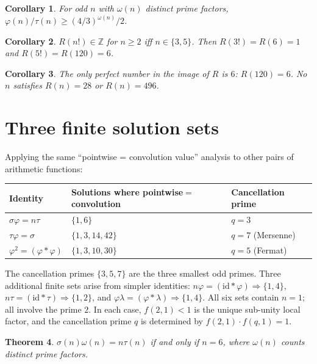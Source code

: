 \documentclass[11pt]{amsart}
\newtheorem{theorem}{Theorem}
\newtheorem{corollary}[theorem]{Corollary}
\theoremstyle{remark}
\begin{document}
\begin{corollary}
For odd $n$ with $\omega(n)$ distinct prime factors,
$\varphi(n)/\tau(n) \geq (4/3)^{\omega(n)}/2$.
\end{corollary}

\begin{corollary}
$R(n!) \in \mathbb{Z}$ for $n \geq 2$ iff $n \in \{3, 5\}$.
Then $R(3!) = R(6) = 1$ and $R(5!) = R(120) = 6$.
\end{corollary}

\begin{corollary}
The only perfect number in the image of $R$ is $6$: $R(120) = 6$.
No $n$ satisfies $R(n) = 28$ or $R(n) = 496$.
\end{corollary}

\section{Three finite solution sets}

Applying the same ``pointwise = convolution value'' analysis to
other pairs of arithmetic functions:

\begin{center}
\begin{tabular}{lll}
\hline
Identity & Solutions where pointwise${}={}$convolution & Cancellation prime\\
\hline
$\sigma\varphi = n\tau$ & $\{1, 6\}$ & $q=3$ \\
$\tau\varphi = \sigma$  & $\{1, 3, 14, 42\}$ & $q=7$ (Mersenne) \\
$\varphi^2 = (\varphi*\varphi)$ & $\{1, 3, 10, 30\}$ & $q=5$ (Fermat) \\
\hline
\end{tabular}
\end{center}

The cancellation primes $\{3,5,7\}$ are the three smallest odd primes.
Three additional finite sets arise from simpler identities:
$n\varphi = (\mathrm{id}*\varphi) \Rightarrow \{1,4\}$,
$n\tau = (\mathrm{id}*\tau) \Rightarrow \{1,2\}$, and
$\varphi\lambda = (\varphi*\lambda) \Rightarrow \{1,4\}$.
All six sets contain $n=1$; all involve the prime $2$.
In each case, $f(2,1) < 1$ is the unique sub-unity local factor,
and the cancellation prime $q$ is determined by $f(2,1) \cdot f(q,1) = 1$.

\begin{theorem}\label{thm:sigma-omega}
$\sigma(n)\omega(n) = n\tau(n)$ if and only if $n = 6$,
where $\omega(n)$ counts distinct prime factors.
\end{theorem}
\end{document}
